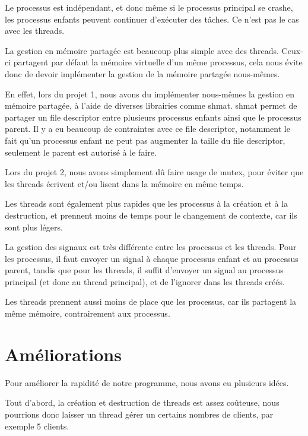 \documentclass[utf8]{article}
\begin{document}
\begin{large}
Le processus est indépendant, et donc même si le processus principal se crashe,
les processus enfants peuvent continuer d'exécuter des tâches. Ce n'est pas le
cas avec les threads.

La gestion en mémoire partagée est beaucoup plus simple avec des threads.
Ceux-ci partagent par défaut la mémoire virtuelle d'un même processus, cela nous
évite donc de devoir implémenter la gestion de la mémoire partagée nous-mêmes.
\par
En effet, lors du projet 1, nous avons du implémenter nous-mêmes la gestion en
mémoire partagée, à l'aide de diverses librairies comme shmat. shmat permet de
partager un file descriptor entre plusieurs processus enfants ainsi que le
processus parent. Il y a eu beaucoup de contraintes avec ce file descriptor,
notamment le fait qu'un processus enfant ne peut pas augmenter la taille du file
descriptor, seulement le parent est autorisé à le faire. 
\par
Lors du projet 2, nous
avons simplement dû faire usage de mutex, pour éviter que les threads écrivent
et/ou lisent dans la mémoire en même temps.
\par
Les threads sont également plus rapides que les processus à la création et à la
destruction, et prennent moins de temps pour le changement de contexte, car ils
sont plus légers.\par La gestion des signaux est très différente entre les
processus et les threads. Pour les processus, il faut envoyer un signal à chaque
processus enfant et au processus parent, tandis que pour les threads, il suffit
d'envoyer un signal au processus principal (et donc au thread principal), et de
l'ignorer dans les threads créés.
\par
Les threads prennent aussi moins de place que les processus, car ils partagent
la même mémoire, contrairement aux processus.




\par
\section{Améliorations}
\par
\indent

Pour améliorer la rapidité de notre programme, nous avons eu plusieurs idées.

Tout d'abord, la création et destruction de threads est assez coûteuse, nous pourrions donc
laisser un thread gérer un certains nombres de clients, par exemple 5 clients.
\par


\end{large}
\end{document}

